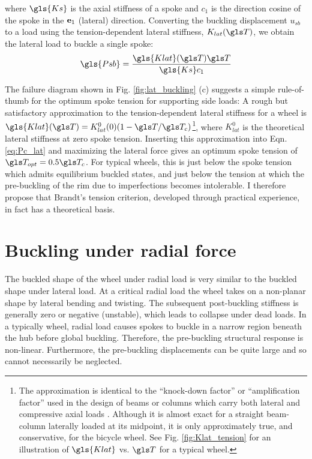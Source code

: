 \documentclass[\rootdir/thesis.tex]{subfiles}
\begin{document}
where $\gls{Ks}$ is the axial stiffness of a spoke and $c_1$ is the direction cosine of the spoke in the $\mathbf{e}_1$ (lateral) direction. Converting the buckling displacement $u_{sb}$ to a load using the tension-dependent lateral stiffness, $K_{lat}(\T)$, we obtain the lateral load to buckle a single spoke:
\begin{equation}
\label{eq:Pc_lat}
\gls{Psb} = \frac{\gls{Klat}(\T) \T}{\gls{Ks} c_1}
\end{equation}

The failure diagram shown in Fig. \ref{fig:lat_buckling} (c) suggests a simple rule-of-thumb for the optimum spoke tension for supporting side loads: A rough but satisfactory approximation to the tension-dependent lateral stiffness for a wheel is $\gls{Klat} (\T)=K_{lat}^0 (0)(1-\T/\T_c)$\footnote{The approximation is identical to the ``knock-down factor'' or ``amplification factor'' used in the design of beams or columns which carry both lateral and compressive axial loads \cite{Timoshenko1961}. Although it is almost exact for a straight beam-column laterally loaded at its midpoint, it is only approximately true, and conservative, for the bicycle wheel. See Fig. \ref{fig:Klat_tension} for an illustration of $\gls{Klat}$ vs. $\T$ for a typical wheel.}, where $K_{lat}^0$ is the theoretical lateral stiffness at zero spoke tension. Inserting this approximation into Eqn. \eqref{eq:Pc_lat} and maximizing the lateral force gives an optimum spoke tension of $\T_{opt} = 0.5 \T_c$. For typical wheels, this is just below the spoke tension which admits equilibrium buckled states, and just below the tension at which the pre-buckling of the rim due to imperfections becomes intolerable. I therefore propose that Brandt's tension criterion, developed through practical experience, in fact has a theoretical basis.


\section{Buckling under radial force}

The buckled shape of the wheel under radial load is very similar to the buckled shape under lateral load. At a critical radial load the wheel takes on a non-planar shape by lateral bending and twisting. The subsequent post-buckling stiffness is generally zero or negative (unstable), which leads to collapse under dead loads. In a typically wheel, radial load causes spokes to buckle in a narrow region beneath the hub before global buckling. Therefore, the pre-buckling structural response is non-linear. Furthermore, the pre-buckling displacements can be quite large and so cannot necessarily be neglected.
\end{document}
